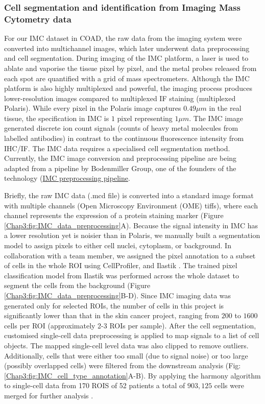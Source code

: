 \subsubsection{Cell segmentation and identification from Imaging Mass Cytometry data}
For our IMC dataset in COAD, the raw data from the imaging system were converted into multichannel images, which later underwent data preprocessing and cell segmentation. During imaging of the IMC platform, a laser is used to ablate and vaporise the tissue pixel by pixel, and the metal probes released from each spot are quantified with a grid of mass spectrometers. Although the IMC platform is also highly multiplexed and powerful, the imaging process produces lower-resolution images compared to multiplexed IF staining (\ie multiplexed Polaris). While every pixel in the Polaris image captures $0.49 \mu m$ in the real tissue, the specification in IMC is $1$ pixel representing $1\mu m$. The IMC image generated discrete ion count signals (counts of heavy metal molecules from labelled antibodies) in contrast to the continuous fluorescence intensity from IHC/IF. The IMC data requires a specialised cell segmentation method. Currently, the IMC image conversion and preprocessing pipeline are being adapted from a pipeline by Bodenmiller Group, one of the founders of the technology (\href{https://github.com/BodenmillerGroup/ImcSegmentationPipeline/blob/development/scripts/imc_preprocessing.ipynb}{IMC preprocessing pipeline}. 

Briefly, the raw IMC data (.mcd file) is converted into a standard image format with multiple channels (Open Microscopy Environment (OME) tiffs), where each channel represents the expression of a protein staining marker (Figure \ref{Chap3:fig:IMC_data_preprocessing}A). Because the signal intensity in IMC has a lower resolution yet is noisier than in Polaris, we manually built a segmentation model to assign pixels to either cell nuclei, cytoplasm, or background. In collaboration with a team member, we assigned the pixel annotation to a subset of cells in the whole ROI using CellProfiler, and Ilastik \cite{carpenter2006cellprofiler, berg2019ilastik}. The trained pixel classification model from Ilastik was performed across the whole dataset to segment the cells from the background (Figure \ref{Chap3:fig:IMC_data_preprocessing}B-D). Since IMC imaging data was generated only for selected ROIs, the number of cells in this project is significantly lower than that in the skin cancer project, ranging from $200$ to $1600$ cells per ROI (approximately 2-3 ROIs per sample). After the cell segmentation, customised single-cell data preprocessing is applied to map signals to a list of cell objects. The mapped single-cell level data was also clipped to remove outliers. Additionally, cells that were either too small (due to  signal noise) or too large (possibly overlapped cells) were filtered from the downstream analysis (Fig: \ref{Chap3:fig:IMC_cell_type_annotation}A-B). By applying the harmony algorithm to single-cell data from 170 ROIS of 52 patients a total of $903,125$ cells were merged for further analysis \cite{korsunsky2019fast}. 

